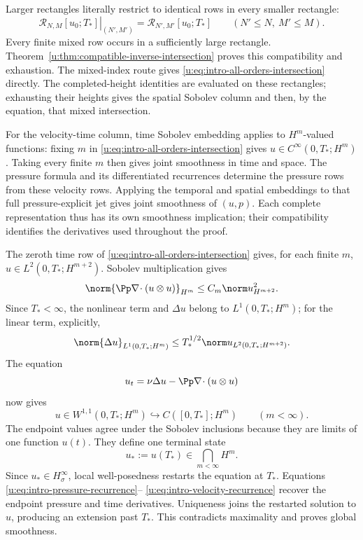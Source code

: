 Larger rectangles literally restrict to identical rows in every smaller
rectangle:
\begin{equation}
 \left.\mathcal R_{N,M}[u_0;T_*]\right|_{(N',M')}
 =\mathcal R_{N',M'}[u_0;T_*]
 \qquad(N'\le N,\ M'\le M).
 \label{u:eq:intro-compatible-intersection}
\end{equation}
Every finite mixed row occurs in a sufficiently large rectangle.
Theorem~\ref{u:thm:compatible-inverse-intersection} proves this compatibility
and exhaustion.  The mixed-index route gives
\eqref{u:eq:intro-all-orders-intersection} directly.  The completed-height
identities are evaluated on these rectangles; exhausting their heights gives
the spatial Sobolev column and then, by the equation, that mixed
intersection.

For the velocity-time column, time Sobolev embedding applies to
\(H^m\)-valued functions: fixing \(m\) in
\eqref{u:eq:intro-all-orders-intersection} gives
\(u\in C^\infty(0,T_*;H^m)\).  Taking every finite \(m\) then gives
joint smoothness in time and space.  The pressure formula and its
differentiated recurrences determine the pressure rows from these velocity
rows.  Applying the temporal and spatial embeddings to that full
pressure-explicit jet gives joint smoothness of \((u,p)\).
Each complete representation thus has its own smoothness implication;
their compatibility identifies the derivatives used throughout the proof.

The zeroth time row of \eqref{u:eq:intro-all-orders-intersection} gives, for
each finite \(m\), \(u\in L^2(0,T_*;H^{m+2})\).  Sobolev multiplication gives
\[
 \norm{\Pp\nabla\!\cdot(u\otimes u)}_{H^m}
 \le C_m\norm u_{H^{m+2}}^2.
\]
Since \(T_*<\infty\), the nonlinear term and \(\Delta u\) belong to
\(L^1(0,T_*;H^m)\); for the linear term, explicitly,
\[
 \norm{\Delta u}_{L^1(0,T_*;H^m)}
 \le T_*^{1/2}\norm u_{L^2(0,T_*;H^{m+2})}.
\]
The equation
\[
 u_t=\nu\Delta u-\Pp\nabla\!\cdot(u\otimes u)
\]
now gives
\[
 u\in W^{1,1}(0,T_*;H^m)
 \hookrightarrow C([0,T_*];H^m)
 \qquad(m<\infty).
\]
The endpoint values agree under the Sobolev inclusions because they are limits
of one function \(u(t)\).  They define one terminal state
\[
 u_*:=u(T_*)\in\bigcap_{m<\infty}H^m.
\]
Since \(u_*\in H^\infty_\sigma\), local well-posedness restarts the equation
at \(T_*\).  Equations \eqref{u:eq:intro-pressure-recurrence}--%
\eqref{u:eq:intro-velocity-recurrence} recover the endpoint pressure and time
derivatives.  Uniqueness joins the restarted solution to \(u\), producing an
extension past \(T_*\).  This contradicts maximality and proves global
smoothness.

\clearpage
